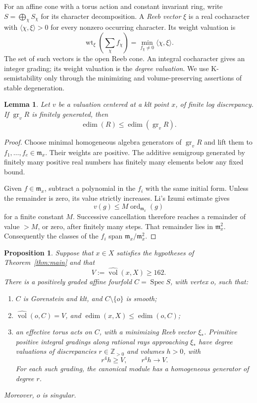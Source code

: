 \documentclass[11pt]{article}
\newtheorem{proposition}[theorem]{Proposition}
\newtheorem{lemma}[theorem]{Lemma}
\theoremstyle{definition}
\theoremstyle{remark}
\numberwithin{equation}{section}
\newcommand{\Z}{\mathbb Z}
\newcommand{\m}{\mathfrak m}
\newcommand{\nvol}{\widehat{\operatorname{vol}}}
\newcommand{\wt}{\operatorname{wt}}
\newcommand{\ord}{\operatorname{ord}}
\newcommand{\edim}{\operatorname{edim}}
\newcommand{\Spec}{\operatorname{Spec}}
\begin{document}
For an affine cone with a torus action and constant invariant ring, write \(S=\bigoplus_\chi S_\chi\) for its character decomposition. A \emph{Reeb vector} \(\xi\) is a real cocharacter with \(\langle\chi,\xi\rangle>0\) for every nonzero occurring character. Its weight valuation is
\[
\wt_\xi\!\left(\sum_\chi f_\chi\right)
=\min_{f_\chi\ne0}\langle\chi,\xi\rangle.
\]
The set of such vectors is the open Reeb cone. An integral cocharacter gives an integer grading; its weight valuation is the \emph{degree valuation}. We use K-semistability only through the minimizing and volume-preserving assertions of stable degeneration.

\begin{lemma}\label{lem:edim}
Let \(v\) be a valuation centered at a klt point \(x\), of finite log discrepancy. If \(\operatorname{gr}_v R\) is finitely generated, then
\[
\edim(R)\le \edim(\operatorname{gr}_v R).
\]
\end{lemma}

\begin{proof}
Choose minimal homogeneous algebra generators of \(\operatorname{gr}_vR\) and lift them to \(f_1,\ldots,f_e\in\m_x\). Their weights are positive. The additive semigroup generated by finitely many positive real numbers has finitely many elements below any fixed bound.

Given \(f\in\m_x\), subtract a polynomial in the \(f_i\) with the same initial form. Unless the remainder is zero, its value strictly increases. Li's Izumi estimate \cite[Theorem~3.1]{Li} gives
\[
v(g)\le M\ord_{\m_x}(g)
\]
for a finite constant \(M\). Successive cancellation therefore reaches a remainder of value \(>M\), or zero, after finitely many steps. That remainder lies in \(\m_x^2\). Consequently the classes of the \(f_i\) span \(\m_x/\m_x^2\).
\end{proof}

\begin{proposition}\label{prop:cone}
Suppose that \(x\in X\) satisfies the hypotheses of Theorem~\ref{thm:main} and that
\[
V:=\nvol(x,X)\ge162.
\]
There is a positively graded affine fourfold \(C=\Spec S\), with vertex \(o\), such that:
\begin{enumerate}[label=(\alph*)]
\item \(C\) is Gorenstein and klt, and \(C\setminus\{o\}\) is smooth;
\item \(\nvol(o,C)=V\), and \(\edim(x,X)\le\edim(o,C)\);
\item an effective torus acts on \(C\), with a minimizing Reeb vector \(\xi_*\). Primitive positive integral gradings along rational rays approaching \(\xi_*\) have degree valuations of discrepancies \(r\in\Z_{>0}\) and volumes \(h>0\), with
\[
r^4h\ge V,\qquad r^4h\longrightarrow V.
\]
For each such grading, the canonical module has a homogeneous generator of degree \(r\).
\end{enumerate}
Moreover, \(o\) is singular.
\end{proposition}
\end{document}
